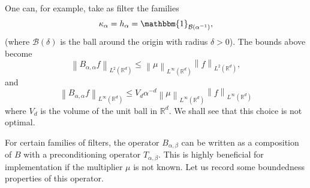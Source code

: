 \documentclass{article}
\theoremstyle{definition}
\newcommand{\R}{\mathbb{R}}
\newcommand{\norm}[1]{\left\lVert#1\right\rVert}
\newcommand{\characteristic}[1]{\mathbbm{1}_{#1}}
\newcommand{\ball}{\mathcal{B}}
\newcommand{\ballorigin}[1]{\ball\left({#1}\right)}
\begin{document}
One can, for example, take as filter the families
\begin{equation*}
    \kappa_\alpha = {h_\alpha} = \characteristic{\ballorigin{\alpha^{-1}}},
\end{equation*}
(where \(\ballorigin{\delta}\) is the  ball around the origin with radius \(\delta>0\)).
The bounds above become
\begin{equation*}
    \norm{B_{\alpha,\alpha}f}_{L^2(\R^d)}\leq
    \norm{
    \mu
    }_{L^\infty(\R^d)}
    \norm{
    f
    }_{L^2(\R^d)},
\end{equation*}
and
\begin{equation*}
    \norm{B_{\alpha,\alpha}f}_{L^\infty(\R^d)}\leq
    V_d\alpha^{-d}
    \norm{
    \mu
    }_{L^\infty(\R^d)}
    \norm{
    f
    }_{L^\infty(\R^d)}
\end{equation*}
where \(V_d\) is the volume of the unit ball in \(\R^d\).
We shall see that this choice is not optimal.

For certain families of filters,
the operator \(B_{\alpha,\beta}\) can be written as a composition of \(B\) with a preconditioning operator \(T_{\alpha,\beta}\).
This is highly beneficial for implementation if the multiplier \(\mu\) is not known.
Let us record some boundedness properties of this operator.
\end{document}
